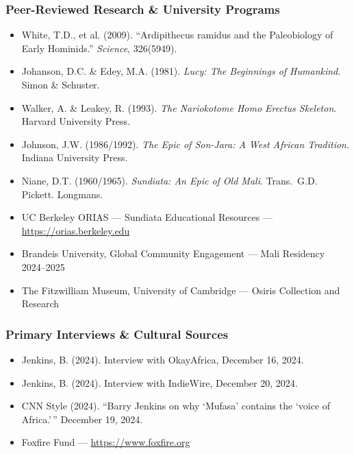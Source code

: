 \documentclass[11pt,letterpaper]{article}
\newcommand{\stageheader}[2]{%
  \noindent\colorbox{#2}{\makebox[\textwidth][l]{%
    \textcolor{white}{\bfseries\sffamily\hspace{6pt}#1\hspace{6pt}}}}%
  \vspace{0.5em}\par%
}
\begin{document}
\subsubsection*{Peer-Reviewed Research \& University Programs}
\begin{itemize}[leftmargin=2em]
  \item White, T.D., et al. (2009). ``Ardipithecus ramidus and the Paleobiology of Early Hominids.'' \textit{Science}, 326(5949).
  \item Johanson, D.C. \& Edey, M.A. (1981). \textit{Lucy: The Beginnings of Humankind}. Simon \& Schuster.
  \item Walker, A. \& Leakey, R. (1993). \textit{The Nariokotome Homo Erectus Skeleton}. Harvard University Press.
  \item Johnson, J.W. (1986/1992). \textit{The Epic of Son-Jara: A West African Tradition}. Indiana University Press.
  \item Niane, D.T. (1960/1965). \textit{Sundiata: An Epic of Old Mali}. Trans.\ G.D. Pickett. Longmans.
  \item UC Berkeley ORIAS --- Sundiata Educational Resources --- \url{https://orias.berkeley.edu}
  \item Brandeis University, Global Community Engagement --- Mali Residency 2024--2025
  \item The Fitzwilliam Museum, University of Cambridge --- Osiris Collection and Research
\end{itemize}

\subsubsection*{Primary Interviews \& Cultural Sources}
\begin{itemize}[leftmargin=2em]
  \item Jenkins, B. (2024). Interview with OkayAfrica, December 16, 2024.
  \item Jenkins, B. (2024). Interview with IndieWire, December 20, 2024.
  \item CNN Style (2024). ``Barry Jenkins on why `Mufasa' contains the `voice of Africa.'\,'' December 19, 2024.
  \item Foxfire Fund --- \url{https://www.foxfire.org}
\end{itemize}

\newpage

\stageheader{STAGE 3 --- MISSION PACKAGE}{tertiary}
\end{document}

